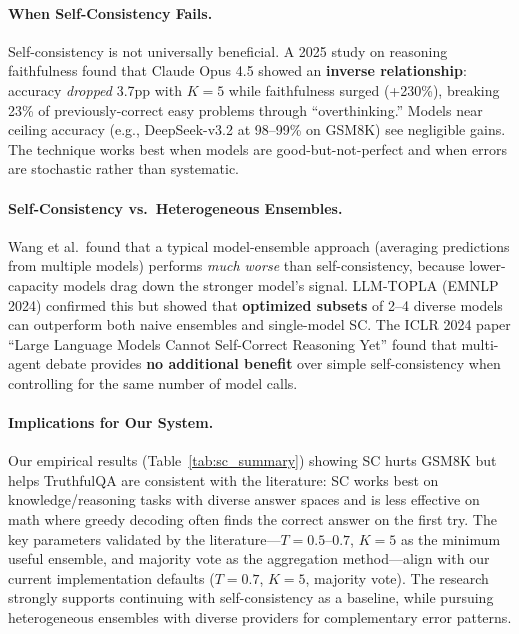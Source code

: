 \documentclass[11pt,a4paper]{article}
\begin{document}
\paragraph{When Self-Consistency Fails.}
Self-consistency is not universally beneficial.
A 2025 study on reasoning faithfulness found that Claude Opus 4.5 showed an \textbf{inverse relationship}: accuracy \emph{dropped} 3.7pp with $K=5$ while faithfulness surged (+230\%), breaking 23\% of previously-correct easy problems through ``overthinking.''
Models near ceiling accuracy (e.g., DeepSeek-v3.2 at 98--99\% on GSM8K) see negligible gains.
The technique works best when models are good-but-not-perfect and when errors are stochastic rather than systematic.

\paragraph{Self-Consistency vs.\ Heterogeneous Ensembles.}
Wang et al.\ found that a typical model-ensemble approach (averaging predictions from multiple models) performs \emph{much worse} than self-consistency, because lower-capacity models drag down the stronger model's signal.
LLM-TOPLA (EMNLP 2024) confirmed this but showed that \textbf{optimized subsets} of 2--4 diverse models can outperform both naive ensembles and single-model SC.
The ICLR 2024 paper ``Large Language Models Cannot Self-Correct Reasoning Yet'' found that multi-agent debate provides \textbf{no additional benefit} over simple self-consistency when controlling for the same number of model calls.

\paragraph{Implications for Our System.}
Our empirical results (Table~\ref{tab:sc_summary}) showing SC hurts GSM8K but helps TruthfulQA are consistent with the literature: SC works best on knowledge/reasoning tasks with diverse answer spaces and is less effective on math where greedy decoding often finds the correct answer on the first try.
The key parameters validated by the literature---$T=0.5$--$0.7$, $K=5$ as the minimum useful ensemble, and majority vote as the aggregation method---align with our current implementation defaults ($T=0.7$, $K=5$, majority vote).
The research strongly supports continuing with self-consistency as a baseline, while pursuing heterogeneous ensembles with diverse providers for complementary error patterns.
\end{document}
